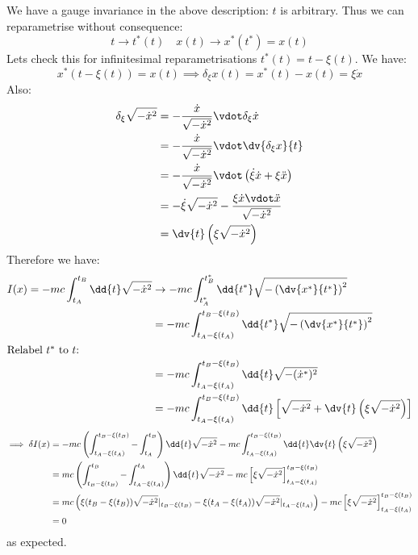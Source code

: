 \documentclass{jknotes}
\begin{document}
We have a gauge invariance in the above description: \(t\) is arbitrary. Thus we can reparametrise without consequence:
\begin{equation}
    t \rightarrow t^*(t)\quad x(t)\rightarrow x^*(t^*) = x(t)
\end{equation}
Lets check this for infinitesimal reparametrisations \(t^*(t) = t - \xi(t)\). We have:
\begin{equation}
    x^*(t-\xi(t)) = x(t) \implies \delta_\xi x(t) = x^*(t)-x(t) = \xi \dot{x}
\end{equation}
Also:
\begin{align}
    \delta_\xi \sqrt{-\dot{x}^2} &= - \frac{\dot{x}}{\sqrt{-\dot{x}^2}}\vdot\delta_\xi \dot{x} \\
    &= - \frac{\dot{x}}{\sqrt{-\dot{x}^2}}\vdot \dv{\delta_\xi x}{t} \\
    &= - \frac{\dot{x}}{\sqrt{-\dot{x}^2}}\vdot \left( \dot{\xi}\dot{x} + \xi\ddot{x} \right) \\
    &= - \dot{\xi} \sqrt{-\dot{x}^2} - \frac{\xi\dot{x}\vdot\ddot{x}}{\sqrt{-\dot{x}^2}} \\
    &= \dv{t}\left( \xi\sqrt{-\dot{x}^2} \right)
\end{align}
Therefore we have:
\begin{align}
    I(x) = -mc\int_{t_A}^{t_B} \dd{t} \sqrt{-\dot{x}^2} &\rightarrow -mc\int_{t_A^*}^{t_B^*} \dd{t^*} \sqrt{- \left( \dv{x^*}{t^*} \right)^2} \\
    &= -mc \int_{t_A-\xi(t_A)}^{t_B-\xi(t_B)} \dd{t^*} \sqrt{- \left( \dv{x^*}{t^*} \right)^2}\\
    \intertext{Relabel \(t^*\) to \(t\):}
    &= -mc \int_{t_A-\xi(t_A)}^{t_B-\xi(t_B)} \dd{t} \sqrt{-(\dot{x}^*)^2} \\
    &= -mc \int_{t_A-\xi(t_A)}^{t_B-\xi(t_B)} \dd{t} \left[ \sqrt{-\dot{x}^2} + \dv{t}\left( \xi\sqrt{-\dot{x}^2} \right) \right]
\end{align}
\begin{align}
    \implies \delta I(x) &= -mc\left( \int_{t_A-\xi(t_A)}^{t_B-\xi(t_B)} - \int_{t_A}^{t_B} \right) \dd{t} \sqrt{-\dot{x}^2} - mc \int_{t_A-\xi(t_A)}^{t_B-\xi(t_B)} \dd{t} \dv{t}\left( \xi\sqrt{-\dot{x}^2} \right) \\
    &= mc \left(\int^{t_B}_{t_B-\xi(t_B)} - \int^{t_A}_{t_A-\xi(t_A)}\right) \dd{t} \sqrt{-\dot{x}^2} -mc \left[ \xi\sqrt{-\dot{x}^2} \right]^{t_B-\xi(t_B)}_{t_A-\xi(t_A)} \\
    &= mc\left(\xi(t_B - \xi(t_B))\sqrt{-\dot{x}^2}|_{t_B-\xi(t_B)} - \xi(t_A - \xi(t_A))\sqrt{-\dot{x}^2}|_{t_A-\xi(t_A)} \right)
-mc \left[ \xi\sqrt{-\dot{x}^2} \right]^{t_B-\xi(t_B)}_{t_A-\xi(t_A)} \\
&= 0
\end{align}
as expected.
\end{document}
